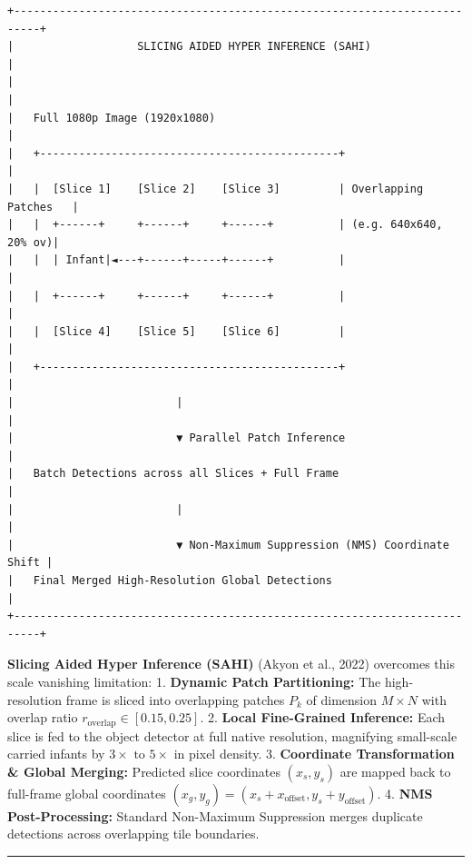 \begin{verbatim}
+--------------------------------------------------------------------------+
|                   SLICING AIDED HYPER INFERENCE (SAHI)                   |
|                                                                          |
|   Full 1080p Image (1920x1080)                                           |
|   +----------------------------------------------+                       |
|   |  [Slice 1]    [Slice 2]    [Slice 3]         | Overlapping Patches   |
|   |  +------+     +------+     +------+          | (e.g. 640x640, 20% ov)|
|   |  | Infant|◄---+------+-----+------+          |                       |
|   |  +------+     +------+     +------+          |                       |
|   |  [Slice 4]    [Slice 5]    [Slice 6]         |                       |
|   +----------------------------------------------+                       |
|                         |                                                |
|                         ▼ Parallel Patch Inference                       |
|   Batch Detections across all Slices + Full Frame                        |
|                         |                                                |
|                         ▼ Non-Maximum Suppression (NMS) Coordinate Shift |
|   Final Merged High-Resolution Global Detections                         |
+--------------------------------------------------------------------------+
\end{verbatim}

\textbf{Slicing Aided Hyper Inference (SAHI)} (Akyon et al., 2022)
overcomes this scale vanishing limitation: 1. \textbf{Dynamic Patch
Partitioning:} The high-resolution frame is sliced into overlapping
patches \(P_k\) of dimension \(M \times N\) with overlap ratio
\(r_{\text{overlap}} \in [0.15, 0.25]\). 2. \textbf{Local Fine-Grained
Inference:} Each slice is fed to the object detector at full native
resolution, magnifying small-scale carried infants by
\(3\times \text{ to } 5\times\) in pixel density. 3. \textbf{Coordinate
Transformation \& Global Merging:} Predicted slice coordinates
\((x_s, y_s)\) are mapped back to full-frame global coordinates
\((x_g, y_g) = (x_s + x_{\text{offset}}, y_s + y_{\text{offset}})\). 4.
\textbf{NMS Post-Processing:} Standard Non-Maximum Suppression merges
duplicate detections across overlapping tile boundaries.

\begin{center}\rule{0.5\linewidth}{0.5pt}\end{center}

